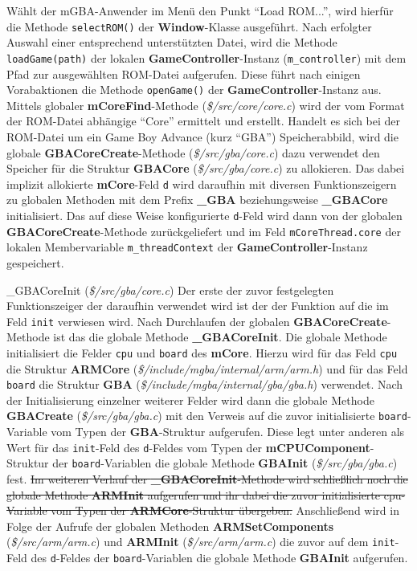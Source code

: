 \documentclass[11pt,a4paper]{scrartcl}
\begin{document}
W\"ahlt der mGBA-Anwender im Men\"u den Punkt \enquote{Load ROM...}, wird hierf\"ur die Methode \verb|selectROM()| der \textbf{Window}-Klasse ausgef\"uhrt. Nach erfolgter Auswahl einer entsprechend unterst\"utzten Datei, wird die Methode \verb|loadGame(path)|  der lokalen \textbf{GameController}-Instanz (\verb|m_controller|) mit dem Pfad zur ausgew\"ahlten ROM-Datei aufgerufen. Diese f\"uhrt nach einigen Vorabaktionen die Methode \verb|openGame()| der \textbf{GameController}-Instanz aus. Mittels globaler \textbf{mCoreFind}-Methode (\textit{\$/src/core/core.c}) wird der vom Format der ROM-Datei abh\"angige \enquote{Core} ermittelt und erstellt. Handelt es sich bei der ROM-Datei um ein Game Boy Advance (kurz \enquote{GBA}) Speicherabbild, wird die globale \textbf{GBACoreCreate}-Methode (\textit{\$/src/gba/core.c}) dazu verwendet den Speicher f\"ur die Struktur \textbf{GBACore} (\textit{\$/src/gba/core.c}) zu allokieren. Das dabei implizit allokierte \textbf{mCore}-Feld \verb|d| wird daraufhin mit diversen Funktionszeigern zu globalen Methoden mit dem Prefix \textbf{{\_}GBA} beziehungsweise \textbf{{\_}GBACore} initialisiert. Das auf diese Weise konfigurierte \verb|d|-Feld wird dann von der globalen \textbf{GBACoreCreate}-Methode zur\"uckgeliefert und im Feld \verb|mCoreThread.core| der lokalen Membervariable \verb|m_threadContext| der \textbf{GameController}-Instanz gespeichert.

\vspace{5mm}
\large {\_}GBACoreInit \normalsize(\textit{\$/src/gba/core.c})
\vspace{2mm}\newline
Der erste der zuvor festgelegten Funktionszeiger der daraufhin verwendet wird ist der der Funktion auf die im Feld \verb|init| verwiesen wird. Nach Durchlaufen der globalen \textbf{GBACoreCreate}-Methode ist das die globale Methode \textbf{{\_}GBACoreInit}. Die globale Methode initialisiert die Felder \verb|cpu| und \verb|board| des \textbf{mCore}. Hierzu wird f\"ur das Feld \verb|cpu| die Struktur \textbf{ARMCore} (\textit{\$/include/mgba/internal/arm/arm.h}) und f\"ur das Feld \verb|board| die Struktur \textbf{GBA} (\textit{\$/include/mgba/internal/gba/gba.h}) verwendet. Nach der Initialisierung einzelner weiterer Felder wird dann die globale Methode \textbf{GBACreate} (\textit{\$/src/gba/gba.c}) mit den Verweis auf die zuvor initialisierte \verb|board|-Variable vom Typen der \textbf{GBA}-Struktur aufgerufen. Diese legt unter anderen als Wert f\"ur das \verb|init|-Feld des \verb|d|-Feldes vom Typen der \textbf{mCPUComponent}-Struktur der \verb|board|-Variablen die globale Methode \textbf{GBAInit} (\textit{\$/src/gba/gba.c}) fest. \sout{Im weiteren Verlauf der \textbf{{\_}GBACoreInit}-Methode wird schlie{\ss}lich noch die globale Methode \textbf{ARMInit} aufgerufen und ihr dabei die zuvor initialisierte cpu-Variable vom Typen der \textbf{ARMCore}-Struktur \"ubergeben.} Anschlie{\ss}end wird in Folge der Aufrufe der globalen Methoden \textbf{ARMSetComponents} (\textit{\$/src/arm/arm.c}) und \textbf{ARMInit} (\textit{\$/src/arm/arm.c}) die zuvor auf dem \verb|init|-Feld des \verb|d|-Feldes der \verb|board|-Variablen die globale Methode \textbf{GBAInit} aufgerufen.
\end{document}
